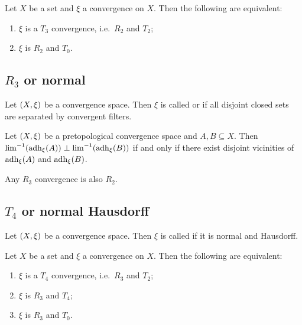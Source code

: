 \begin{proposition}
Let $X$ be a set and $\xi$ a convergence on $X$. Then the following are equivalent:
\begin{enumerate}
\item $\xi$ is a $T_3$ convergence, i.e.\ $R_2$ and $T_2$;
\item $\xi$ is $R_2$ and $T_0$.
\end{enumerate}
\end{proposition}

\subsection{$R_3$ or normal}
\begin{definition}
Let $\left( X,\xi \right)$ be a convergence space. Then $\xi$ is called  or  if all disjoint closed sets are separated by convergent filters.
\end{definition}

\begin{proposition}
Let $\left( X,\xi \right)$ be a pretopological convergence space and $A,B\subseteq X$. Then $\lim^{-1}(\operatorname{adh}_\xi(A)) \perp \lim^{-1}(\operatorname{adh}_\xi(B))$ \textup{if and only if} there exist disjoint vicinities of $\operatorname{adh}_\xi(A)$ and $\operatorname{adh}_\xi(B)$.
\end{proposition}

\begin{proposition}
Any $R_3$ convergence is also $R_2$.
\end{proposition}


\subsection{$T_4$ or normal Hausdorff}
\begin{definition}
Let $\left( X,\xi \right)$ be a convergence space. Then $\xi$ is called  if it is normal and Hausdorff.
\end{definition}

\begin{proposition}
Let $X$ be a set and $\xi$ a convergence on $X$. Then the following are equivalent:
\begin{enumerate}
\item $\xi$ is a $T_4$ convergence, i.e.\ $R_3$ and $T_2$;
\item $\xi$ is $R_3$ and $T_4$;
\item $\xi$ is $R_3$ and $T_0$.
\end{enumerate}
\end{proposition}



